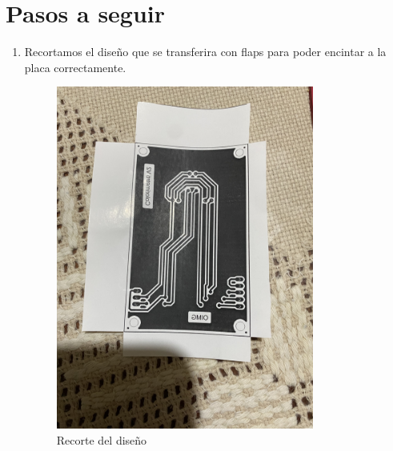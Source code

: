 \documentclass[12pt]{report}
\begin{document}
\section{Pasos a seguir}
\begin{enumerate}
  \item Recortamos el diseño que se transferira con flaps para poder encintar a la placa correctamente.
        \begin{figure}[H]
            \centering
            \includegraphics[width=0.8\textwidth]{screenshots/img1.jpg}
            \caption{Recorte del diseño}


\end{figure}
\end{enumerate}
\end{document}
